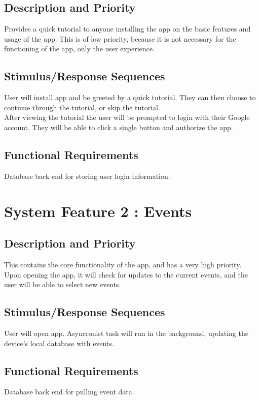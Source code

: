 \documentclass{scrreprt}
\begin{document}
\subsection{Description and Priority}
Provides a quick tutorial to anyone installing the app on the basic features and 
usage of the app. This is of low priority, because it is not necessary for the functioning 
of the app, only the user experience.

\subsection{Stimulus/Response Sequences}
User will install app and be greeted by a quick tutorial. They can then choose to 
continue through the tutorial, or skip the tutorial. \\
After viewing the tutorial the user will be prompted to login with their Google account.
They will be able to click a single button and authorize the app.

\subsection{Functional Requirements}
Database back end for storing user login information.

\section{System Feature 2 : Events}

\subsection{Description and Priority}
This contains the core functionality of the app, and has a very high priority. Upon opening 
the app, it will check for updates to the current events, and the user will be able to 
select new events.

\subsection{Stimulus/Response Sequences}
User will open app. Asyncronist task will run in the background, updating the device's
local database with events.

\subsection{Functional Requirements}
Database back end for pulling event data.
\end{document}
